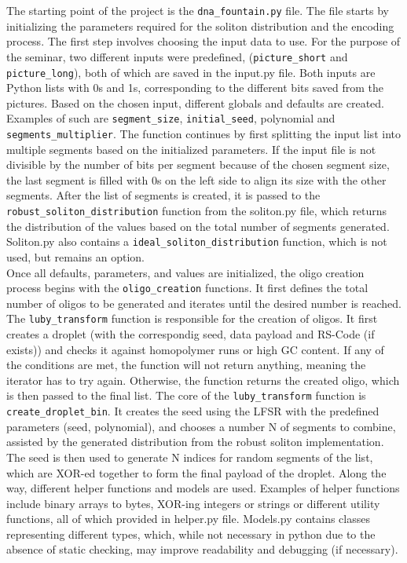 \documentclass[12pt]%
{article}
\begin{document}
The starting point of the project is the \texttt{dna\_fountain.py} file. The file starts by initializing the parameters required for the soliton distribution and the encoding process. The first step involves choosing the input data to use. For the purpose of the seminar, two different inputs were predefined, (\texttt{picture\_short} and \texttt{picture\_long}), both of which are saved in the input.py file. Both inputs are Python lists with 0s and 1s, corresponding to the different bits saved from the pictures. Based on the chosen input, different globals and defaults are created. Examples of such are \texttt{segment\_size}, \texttt{initial\_seed}, polynomial and \texttt{segments\_multiplier}. The function continues by first splitting the input list into multiple segments based on the initialized parameters. If the input file is not divisible by the number of bits per segment because of the chosen segment size, the last segment is filled with 0s on the left side to align its size with the other segments. After the list of segments is created, it is passed to the \texttt{robust\_soliton\_distribution} function from the soliton.py file, which returns the distribution of the values based on the total number of segments generated. Soliton.py also contains a \texttt{ideal\_soliton\_distribution} function, which is not used, but remains an option. \\
Once all defaults, parameters, and values are initialized, the oligo creation process begins with the \texttt{oligo\_creation} functions. It first defines the total number of oligos to be generated and iterates until the desired number is reached. The \texttt{luby\_transform} function is responsible for the creation of oligos. It first creates a droplet (with the correspondig seed, data payload and RS-Code (if exists)) and checks it against homopolymer runs or high GC content. If any of the conditions are met, the function will not return anything, meaning the iterator has to try again. Otherwise, the function returns the created oligo, which is then passed to the final list. The core of the \texttt{luby\_transform} function is \texttt{create\_droplet\_bin}. It creates the seed using the LFSR with the predefined parameters (seed, polynomial), and chooses a number N of segments to combine, assisted by the generated distribution from the robust soliton implementation.  The seed is then used to generate N indices for random segments of the list, which are XOR-ed together to form the final payload of the droplet. Along the way, different helper functions and models are used. Examples of helper functions include binary arrays to bytes, XOR-ing integers or strings or different utility functions, all of which provided in helper.py file. Models.py contains classes representing different types, which, while not necessary in python due to the absence of static checking, may improve readability and debugging (if necessary). \\
\end{document}
